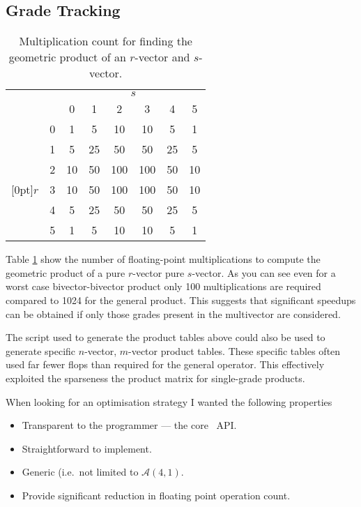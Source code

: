 \subsection{Grade Tracking}

\begin{table}
\centering
\begin{tabular}{cc|cccccc}
 \multicolumn{2}{c}{} & \multicolumn{6}{c}{$s$} \\
&  & 0 & 1 & 2 & 3 & 4 & 5 \\
\cline{2-8}
& 0 & 1 & 5 &10 &10 & 5 & 1 \\
& 1 & 5 & 25&50 &50 &25 & 5\\
& 2 & 10& 50&100&100&50 & 10\\
\raisebox{1.5ex}[0pt]{$r$} & 3 & 10& 50&100&100&50 & 10\\
& 4 & 5 & 25&50 &50 &25 & 5\\
& 5 & 1 & 5 &10 &10 & 5 & 1
\end{tabular}
\caption{Multiplication count for finding the geometric product of an
$r$-vector and $s$-vector.
\label{tab:grades}}
\end{table}

Table \ref{tab:grades} show the number of floating-point multiplications to
compute the geometric product of a pure $r$-vector pure $s$-vector. As you can
see even for a worst case bivector-bivector product only 100 multiplications
are required compared to 1024 for the general product. This suggests that
significant speedups can be obtained if only those grades present in the
multivector are considered.

The script used to generate the product tables above could also be used to
generate specific $n$-vector, $m$-vector product tables. These specific
tables often used far fewer flops than required for the general operator.
This effectively exploited the sparseness the product matrix for single-grade
products.

When looking for an optimisation strategy I wanted the following properties

\begin{itemize}
\item Transparent to the programmer --- the core \libcga\ API.
\item Straightforward to implement.
\item Generic (i.e.\ not limited to $\mathcal{A}(4,1)$.
\item Provide significant reduction in floating point operation count.
\end{itemize}

